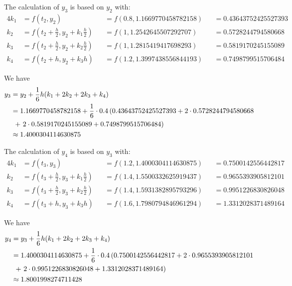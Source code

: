 \documentclass[a4paper]{article}
\numberwithin{equation}{section}
\begin{document}
The calculation of \( y_3 \) is based on \( y_2 \) with:
\begin{alignat*}{4}
  k_1 & = f(t_2, y_2)                                            &  & = f(0.8, 1.1669770458782158) &  & = 0.43643752425527393 \\
  k_2 & = f \left(t_2 + \frac{h}{2}, y_2 + k_1\frac{h}{2}\right) &  & = f(1, 1.2542645507292707)   &  & = 0.5728244794580668  \\
  k_3 & = f \left(t_2 + \frac{h}{2}, y_2 + k_2\frac{h}{2}\right) &  & = f(1, 1.2815419417698293)   &  & = 0.5819170245155089  \\
  k_4 & = f(t_2 + h, y_2 + k_3h)                                 &  & = f(1.2, 1.3997438556844193) &  & = 0.7498799515706484
\end{alignat*}

We have
\begin{align*}
  y_3 & = y_2 + \frac{1}{6}h(k_1 + 2k_2 + 2k_3 + k_4)                                                             \\
      & = 1.1669770458782158 + \frac{1}{6} \cdot 0.4\left(0.43643752425527393 + 2 \cdot 0.5728244794580668\right. \\
      & \ \left.+\ 2 \cdot 0.5819170245155089 + 0.7498799515706484\vphantom{1}\right)                             \\
      & \approx 1.4000304114630875
\end{align*}

The calculation of \( y_4 \) is based on \( y_3 \) with:
\begin{alignat*}{4}
  k_1 & = f(t_3, y_3)                                            &  & = f(1.2, 1.4000304114630875) &  & = 0.7500142556442817 \\
  k_2 & = f \left(t_3 + \frac{h}{2}, y_3 + k_1\frac{h}{2}\right) &  & = f(1.4, 1.5500332625919437) &  & = 0.9655393905812101 \\
  k_3 & = f \left(t_3 + \frac{h}{2}, y_3 + k_2\frac{h}{2}\right) &  & = f(1.4, 1.5931382895793296) &  & = 0.9951226830826048 \\
  k_4 & = f(t_3 + h, y_3 + k_3h)                                 &  & = f(1.6, 1.7980794846961294) &  & = 1.3312028371489164
\end{alignat*}

We have
\begin{align*}
  y_4 & = y_3 + \frac{1}{6}h(k_1 + 2k_2 + 2k_3 + k_4)                                                            \\
      & = 1.4000304114630875 + \frac{1}{6} \cdot 0.4\left(0.7500142556442817 + 2 \cdot 0.9655393905812101\right. \\
      & \ \left.+\ 2 \cdot 0.9951226830826048 + 1.3312028371489164\vphantom{1}\right)                            \\
      & \approx 1.8001998274711428
\end{align*}
\end{document}
